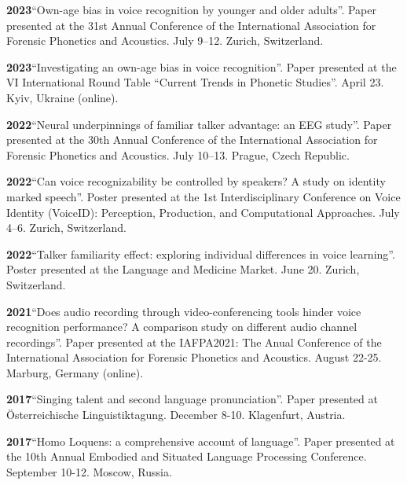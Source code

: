 \documentclass[11pt]{article}
\newcommand{\hangpara}{
 \setlength{\parindent}{0in} %
 \hangindent=0.42in %
}
\begin{document}
\vskip 6pt
\hangpara
{\bf 2023}\hspace{1ex}“Own-age bias in voice recognition by younger and older adults”. Paper presented at the 31st Annual Conference of the International Association for Forensic Phonetics and Acoustics. July 9--12. Zurich, Switzerland.


\vskip 6pt
\hangpara
{\bf 2023}\hspace{1ex}“Investigating an own-age bias in voice recognition”. Paper presented at the VI International Round Table “Current Trends in Phonetic Studies”. April 23. Kyiv, Ukraine (online).


\vskip 6pt
\hangpara
{\bf 2022}\hspace{1ex}“Neural underpinnings of familiar talker advantage: an EEG study”. Paper presented at the 30th Annual Conference of the International Association for Forensic Phonetics and Acoustics. July 10--13. Prague, Czech Republic.


\vskip 6pt
\hangpara
{\bf 2022}\hspace{1ex}“Can voice recognizability be controlled by speakers? A study on identity marked speech”. Poster presented at the 1st Interdisciplinary Conference on Voice Identity (VoiceID): Perception, Production, and Computational Approaches. July 4--6. Zurich, Switzerland.


\vskip 6pt
\hangpara
{\bf 2022}\hspace{1ex}“Talker familiarity effect: exploring individual differences in voice learning”. Poster presented at the Language and Medicine Market. June 20. Zurich, Switzerland.


\vskip 6pt
\hangpara
{\bf 2021}\hspace{1ex}“Does audio recording through video-conferencing tools hinder voice recognition performance? A comparison study on different audio channel recordings”. Paper presented at the IAFPA2021: The Anual Conference of the International Association for Forensic Phonetics and Acoustics. August 22-25. Marburg, Germany (online).


\vskip 6pt
\hangpara
{\bf 2017}\hspace{1ex}“Singing talent and second language pronunciation”. Paper presented at Österreichische Linguistiktagung. December 8-10. Klagenfurt, Austria.


\vskip 6pt
\hangpara
{\bf 2017}\hspace{1ex}“Homo Loquens: a comprehensive account of language”. Paper presented at the 10th Annual Embodied and Situated Language Processing Conference. September 10-12. Moscow, Russia.
\end{document}
